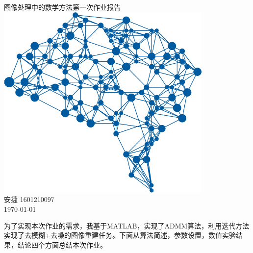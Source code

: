 \documentclass[a4paper, UTF8]{ctexrep}
\begin{document}
	\begin{titlepage}
		\centering
		\vspace{6cm}
		\LARGE{图像处理中的数学方法第一次作业报告}\\
		\vspace{3cm}
		\includegraphics[width=0.8\textwidth]{deepLearning.png}\\
		\vspace{4cm}
		\normalsize{安捷 1601210097}\\
		\normalsize{\today}
	\end{titlepage}
	为了实现本次作业的需求，我基于MATLAB，实现了ADMM算法，利用迭代方法实现了去模糊+去噪的图像重建任务。下面从算法简述，参数设置，数值实验结果，结论四个方面总结本次作业。
\end{document}
